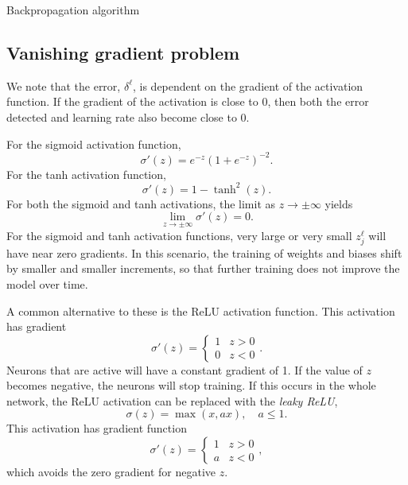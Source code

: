 \begin{algorithm}[H]
\label{nnets-bprop-alg}
\SetAlgoLined
{}
\caption{Backpropagation algorithm}
\end{algorithm}




\subsection*{Vanishing gradient problem}\label{nnet-vanishinggradprob}
We note that the error, $\delta^\ell$, is dependent on the gradient of the activation function. If the gradient of the activation is close to 0, then both the error detected and learning rate also become close to 0.

\noindent For the sigmoid activation function,
\[
	\sigma '(z) = e^{-z}(1+e^{-z})^{-2}.
\]
For the tanh activation function,
\[
	\sigma '(z) = 1-\tanh^2(z).
\]
For both the sigmoid and tanh activations, the limit as $z\rightarrow\pm\infty$ yields 
\[
	\lim_{z\rightarrow\pm\infty}\sigma '(z)= 0.
\]
For the sigmoid and tanh activation functions, very large or very small $z_j^\ell$ will have near zero gradients. In this scenario, the training of weights and biases shift by smaller and smaller increments, so that further training does not improve the model over time.

A common alternative to these is the ReLU activation function. This activation has gradient
\[
	\sigma '(z) = \begin{cases}
		1 & z > 0 \\
		0 & z < 0
	\end{cases}.
\]
Neurons that are active will have a constant gradient of 1. If the value of $z$ becomes negative, the neurons will stop training. If this occurs in the whole network, the ReLU activation can be replaced with the \textit{leaky ReLU},
\[
	\sigma(z) = \max(x, ax), \quad a \le 1.
\]
This activation has gradient function
\[
	\sigma '(z) = \begin{cases}
		1 & z > 0 \\
		a & z < 0
	\end{cases},
\]
which avoids the zero gradient for negative $z$.

